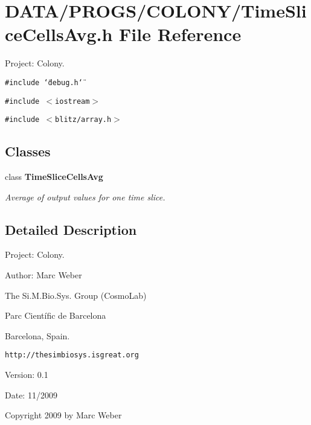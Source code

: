 \section{DATA/PROGS/COLONY/TimeSliceCellsAvg.h File Reference}
\label{TimeSliceCellsAvg_8h}
Project: Colony. 

{\tt \#include \char`\"{}debug.h\char`\"{}}\par
{\tt \#include $<$iostream$>$}\par
{\tt \#include $<$blitz/array.h$>$}\par
\subsection*{Classes}
\begin{CompactItemize}
\item 
class {\bf TimeSliceCellsAvg}
\begin{CompactList}\small\item\em Average of output values for one time slice. \item\end{CompactList}\end{CompactItemize}


\subsection{Detailed Description}
Project: Colony. 

\begin{Desc}
\item[Author:]Marc Weber\par
 The Si.M.Bio.Sys. Group (CosmoLab)\par
 Parc Científic de Barcelona\par
 Barcelona, Spain.\par
 {\tt http://thesimbiosys.isgreat.org} \end{Desc}
\begin{Desc}
\item[Version:]0.1 \end{Desc}
\begin{Desc}
\item[Date:]11/2009\end{Desc}
Copyright 2009 by Marc Weber 